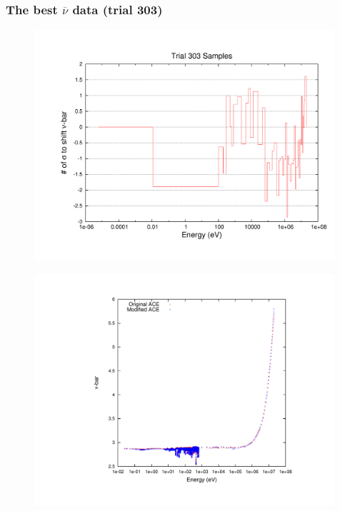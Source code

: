 \documentclass[xcolor=dvipsnames,hyperref={pdfpagelabels=false},unknownkeysallowed]{beamer}
\newcommand{\nubar}[0]{\ensuremath{\overline{\nu}} }
\begin{document}
\begin{frame}
\frametitle{The best \nubar data (trial 303) }
\begin{minipage}{0.49\textwidth}
\begin{figure}[h!]
\centering
\includegraphics[trim = 0.75in 0.5in 0.25in 0.5in, clip, width=0.99\textwidth]{nubarFigures/nubar_shift.pdf}
\end{figure}
\end{minipage}
\begin{minipage}{0.49\textwidth}
\begin{figure}[h!]
\centering
\includegraphics[trim= 1.75in 0.75in 0.75in 0.75in, clip, width=0.99\textwidth]{nubarFigures/nubar.pdf}
\end{figure}
\end{minipage}
\end{frame} 
\end{document}
